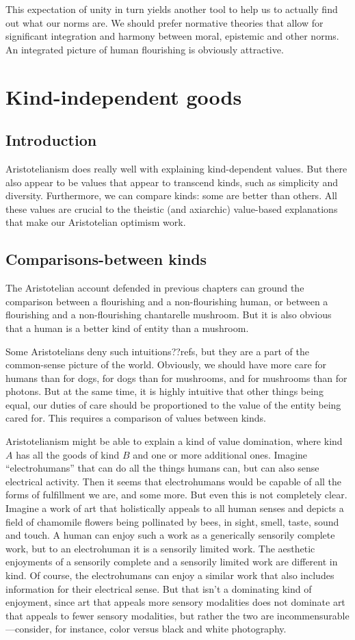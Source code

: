 This expectation of unity in turn yields another tool to help us to actually find out what our norms are. We should prefer normative theories
that allow for significant integration and harmony between moral, epistemic and other norms. An integrated picture of human flourishing
is obviously attractive.

\section{Kind-independent goods}\label{sec:global}
\subsection{Introduction}
Aristotelianism does really well with explaining kind-dependent values. But there also appear to be values that appear
to transcend kinds, such as simplicity and diversity. Furthermore, we can compare kinds: some are better than others.
All these values are crucial to the theistic (and axiarchic) value-based explanations that make our 
Aristotelian optimism work.

\subsection{Comparisons-between kinds}
The Aristotelian account defended in previous chapters can ground the comparison between a flourishing and a non-flourishing 
human, or between a flourishing and a non-flourishing chantarelle mushroom. But it is also obvious that a human is a better
kind of entity than a mushroom. 

Some Aristotelians deny such intuitions??refs, but they are a part of the common-sense picture of the world. 
Obviously, we should have more care for humans than for dogs,  for dogs than for mushrooms, and for 
mushrooms than for photons. But at the same time, it is highly intuitive that other things being equal, our 
duties of care should be proportioned to the value of the entity being cared for. This requires a comparison
of values between kinds. 

Aristotelianism might be able to explain a kind of value domination, where kind $A$ has all the goods of kind
$B$ and one or more additional ones. Imagine ``electrohumans'' that can do all the things humans can, but can also sense
electrical activity. Then it seems that electrohumans would be capable of all the forms of fulfillment we are, and 
some more. But even this is not completely clear. Imagine a work of art that holistically appeals to all
human senses and depicts a field of chamomile flowers being pollinated by bees, in sight, smell, taste, sound and touch.
A human can enjoy such a work as a generically sensorily complete work, but to an electrohuman it is a sensorily limited 
work. The aesthetic enjoyments of a sensorily complete and a sensorily limited work are different in kind. Of course, 
the electrohumans can enjoy a similar work that also includes information for their electrical sense. But that isn't 
a dominating kind of enjoyment, since art that appeals more sensory modalities does not dominate art that appeals to 
fewer sensory modalities, but rather the two are incommensurable---consider, for instance, color versus black and white
photography. 

